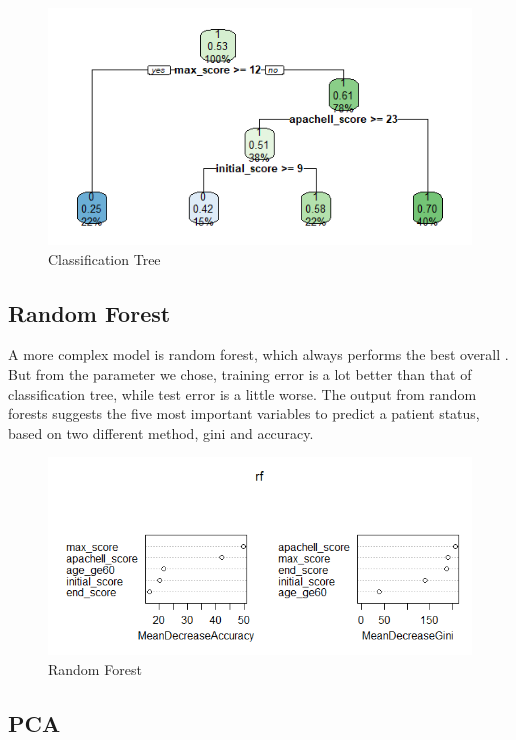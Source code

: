 \documentclass{article}
\begin{document}
\begin{figure}[h!]
  \centering
  \includegraphics[width=120mm]{classificationTree.png}
  \caption{Classification Tree}
  \label{fig:Classification Tree output}
\end{figure}

\subsection{Random Forest}

A more complex model is random forest, which always performs the best overall \cite{Breiman}. But from the parameter we chose, training error is a lot better than that of classification tree, while test error is a little worse. The output from random forests suggests the five most important variables to predict a patient status, based on two different method, gini and accuracy. 

\begin{figure}[h!]
  \centering
  \includegraphics[width=120mm]{rf.png}
  \caption{Random Forest}
  \label{fig:Random Forest output}
\end{figure}


\subsection{PCA}
\end{document}
